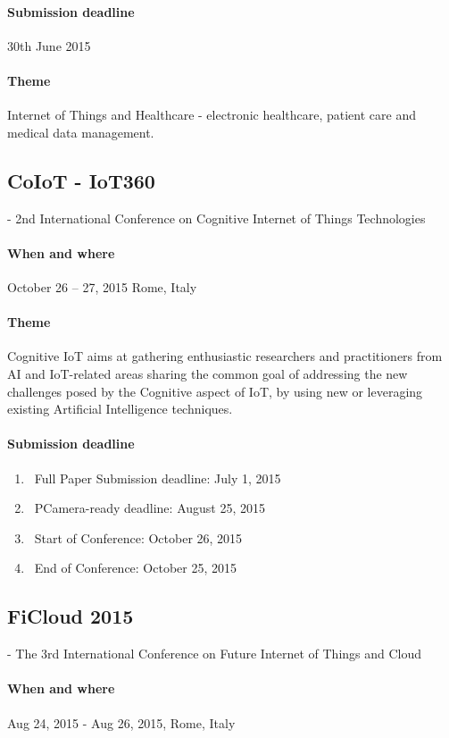 \documentclass[12pt]{article}
\begin{document}
\paragraph {Submission deadline} 30th June 2015
\paragraph {Theme} Internet of Things and Healthcare - electronic healthcare, patient care and medical data management.

\subsection {CoIoT - IoT360} - 2nd International Conference on Cognitive Internet of Things Technologies
\paragraph {When and where}  October 26 – 27, 2015 Rome, Italy
\paragraph {Theme} Cognitive IoT aims at gathering enthusiastic researchers and practitioners from AI and IoT-related areas sharing the common goal of addressing the new challenges posed by the Cognitive aspect of IoT, by using new or leveraging existing Artificial Intelligence techniques.

\paragraph {Submission deadline}
\begin{enumerate}
\item\ Full Paper Submission deadline: July 1, 2015
\item\ PCamera-ready deadline: August 25, 2015
\item\ Start of Conference: October 26, 2015
\item\ End of Conference: October 25, 2015
\end{enumerate}

\subsection{FiCloud 2015 } - The 3rd International Conference on Future Internet of Things and Cloud
\paragraph {When and where} Aug 24, 2015 - Aug 26, 2015, Rome, Italy
\end{document}
